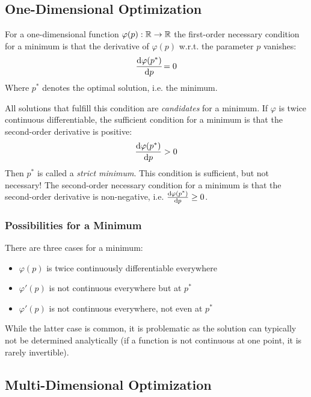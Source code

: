 		\subsection{One-Dimensional Optimization}
			For a one-dimensional function \( \varphi(p) : \mathbb{R} \to \mathbb{R} \) the first-order necessary condition for a minimum is that the derivative of \( \varphi(p) \) w.r.t. the parameter \(p\) vanishes:
			\begin{align*}
				\dv{\varphi(p^\ast)}{p} \! = 0
			\end{align*}
			Where \( p^\ast \) denotes the optimal solution, i.e. the minimum.

			All solutions that fulfill this condition are \emph{candidates} for a minimum. If \( \varphi \) is twice continuous differentiable, the sufficient condition for a minimum is that the second-order derivative is positive:
			\begin{align*}
				\dv{\varphi(p^\ast)}{p} > 0
			\end{align*}
			Then \(p^\ast\) is called a \emph{strict minimum}. This condition is sufficient, but not necessary! The second-order necessary condition for a minimum is that the second-order derivative is non-negative, i.e. \( \dv{\varphi(p^\ast)}{p} \geq 0 \).

			\subsubsection{Possibilities for a Minimum}
				There are three cases for a minimum:
				\begin{itemize}
					\item \(\varphi(p)\) is twice continuously differentiable everywhere
					\item \(\varphi'(p)\) is not continuous everywhere but at \(p^\ast\)
					\item \(\varphi'(p)\) is not continuous everywhere, not even at \(p^\ast\)
				\end{itemize}
				While the latter case is common, it is problematic as the solution can typically not be determined analytically (if a function is not continuous at one point, it is rarely invertible).

		\subsection{Multi-Dimensional Optimization}
			\label{subsec:multiDimensionalOptimalityConditions}

